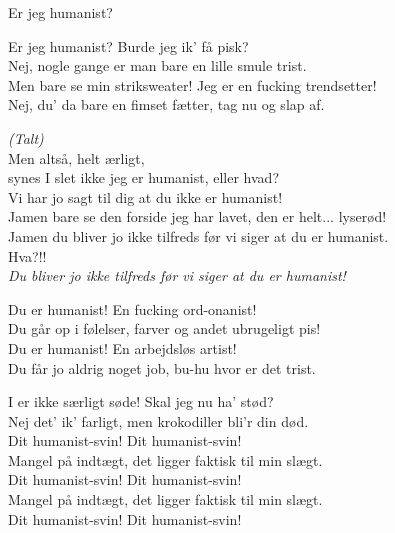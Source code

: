 \begin{song}{Er jeg humanist?}
  \begin{SBChorus}
    Er jeg humanist? Burde jeg ik' få pisk?\\
    Nej, nogle gange er man bare en lille smule trist.\\
    Men bare se min striksweater! Jeg er en fucking trendsetter!\\
    Nej, du' da bare en fimset fætter, tag nu og slap af.\\
  \end{SBChorus}

  \begin{SBSection*}
    \emph{(Talt)}\\
    Men altså, helt ærligt,\\
    synes I slet ikke jeg er humanist, eller hvad?\\
    Vi har jo sagt til dig at du ikke er humanist!\\
    Jamen bare se den forside jeg har lavet, den er helt... lyserød!\\
    Jamen du bliver jo ikke tilfreds før vi siger at du er humanist.\\
    Hva?!!\\
    \emph{Du bliver jo ikke tilfreds før vi siger at du er humanist!}
  \end{SBSection*}

  \begin{SBChorus}
    Du er humanist! En fucking ord-onanist!\\
    Du går op i følelser, farver og andet ubrugeligt pis!\\
    Du er humanist! En arbejdsløs artist!\\
    Du får jo aldrig noget job, bu-hu hvor er det trist.
  \end{SBChorus}

  \begin{SBChorus}
    I er ikke særligt søde! Skal jeg nu ha' stød?\\
    Nej det' ik' farligt, men krokodiller bli'r din død.\\
    Dit humanist-svin! Dit humanist-svin!\\
    Mangel på indtægt, det ligger faktisk til min slægt.\\
    Dit humanist-svin! Dit humanist-svin!\\
    Mangel på indtægt, det ligger faktisk til min slægt.\\
    Dit humanist-svin! Dit humanist-svin!
  \end{SBChorus}
\end{song}












